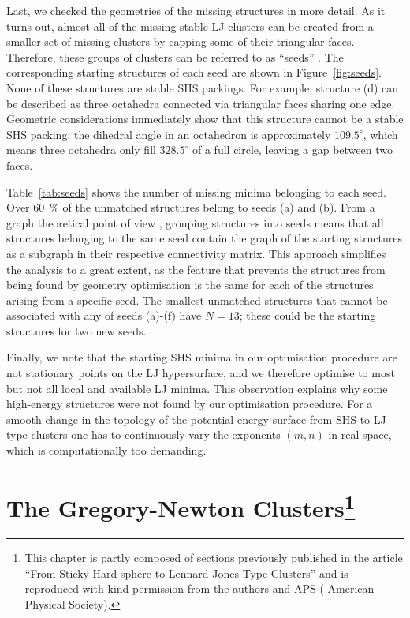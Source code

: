 Last, we checked the geometries of the missing structures in more detail.
As it turns out, almost all of the missing stable LJ clusters can be created
from a smaller set of missing clusters by capping some of their triangular
faces. Therefore, these groups of clusters can be referred to as ``seeds''
\autocite{Arkus_DerivingFiniteSphere_2011}. The corresponding starting structures of each seed
are shown in Figure~\ref{fig:seeds}. 
None of these structures are stable SHS packings. For
example, structure (d) can be described as three octahedra connected via
triangular faces sharing one edge. Geometric considerations \autocite{Arkus_DerivingFiniteSphere_2011,Hoy_Structurefinitesphere_2012} immediately show
that this structure cannot be a stable SHS packing;
the dihedral angle in an octahedron is approximately $109.5^\circ$, which means three
octahedra only fill $328.5^\circ$ of a full circle, leaving a gap between two
faces. 


Table~\ref{tab:seeds} shows the number of missing minima belonging to each seed.
Over 60~\% of the unmatched structures belong to seeds (a) and (b).  
From a graph theoretical point of view \autocite{Arkus_Minimalenergyclusters_2009,Arkus_DerivingFiniteSphere_2011},
grouping structures into seeds means that all structures belonging to the same
seed contain the graph of the starting structures as a subgraph in their
respective connectivity matrix.  This approach simplifies the analysis to a
great extent, as the feature that prevents the structures from being found by
geometry optimisation is the same for each of the structures arising from a
specific seed.  
The smallest unmatched structures that cannot be associated with any of seeds (a)-(f) have $N=13$;
these could be the starting structures for two new seeds.


Finally, we note that the starting SHS minima in our optimisation procedure are
not stationary points on the LJ hypersurface, and we therefore optimise to most
but not all local and available LJ minima. This observation explains why some high-energy
structures were not found by our optimisation procedure. For a smooth change in the topology of the potential energy surface
from SHS to LJ type clusters one has to continuously vary the exponents $(m,n)$
in real space, which is computationally too demanding.


\chapter[The Gregory-Newton Clusters]{
    The Gregory-Newton Clusters\footnote{This chapter is partly composed of sections
    previously published in the article ``From Sticky-Hard-sphere to
    Lennard-Jones-Type Clusters''\autocite{} and is reproduced with kind
    permission from the authors and APS ( American Physical
    Society).}
}
\label{sec:thegregorynewtonclusters}

